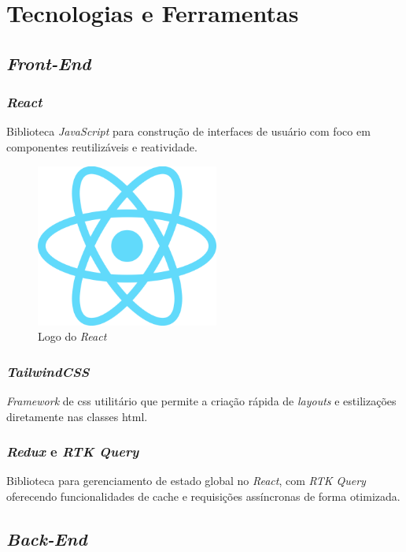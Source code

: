 \section{Tecnologias e Ferramentas} 

\subsection{\emph{Front-End}} 

\subsubsection{\emph{React}} 
Biblioteca \emph{JavaScript} para construção de interfaces de usuário com foco em componentes reutilizáveis e reatividade.

\begin{figure}[htb]
	\centering
	\includegraphics[width=6cm]{cap04-desenvolvimento/images/4-4-1-1-react}
	\caption{Logo do \emph{React}}
	\label{fig:logo_react}
\end{figure}


\subsubsection{\emph{TailwindCSS}} 
\emph{Framework} de \gls{css} utilitário que permite a criação rápida de \emph{layouts} e estilizações diretamente nas classes \gls{html}.

\subsubsection{\emph{Redux} e \emph{RTK Query}} 
Biblioteca para gerenciamento de estado global no \emph{React}, com \emph{RTK Query} oferecendo funcionalidades de cache e requisições assíncronas de forma otimizada.

\subsection{\emph{Back-End}} 

